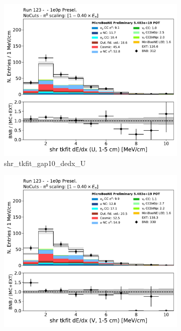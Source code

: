 \begin{figure}[H] 
\begin{center}
    \begin{subfigure}[b]{0.3\textwidth}
    \centering
    \includegraphics[width=1.00\textwidth]{1e0p/dataMCRun123/shr_tkfit_gap10_dedx_U.pdf}
    \caption{\label{fig:1e0p:dataMCRun1:shr_tkfit_gap10_dedx_U} shr\_tkfit\_gap10\_dedx\_U }
    \end{subfigure}
    \begin{subfigure}[b]{0.3\textwidth}
    \centering
    \includegraphics[width=1.00\textwidth]{1e0p/dataMCRun123/shr_tkfit_gap10_dedx_V.pdf}

\end{subfigure}
\end{center}
\end{figure}
